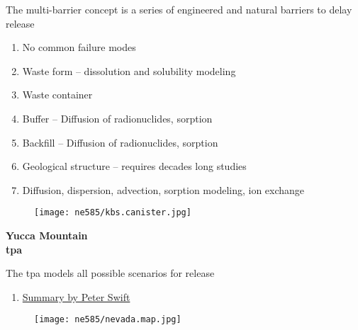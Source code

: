 \documentclass[aspectratio=1610,pdftex,dvipsnames,compress,xcolor={dvipsnames}]{beamer}
\newcommand{\acf}{\acrfull} %
\newcommand{\acs}{\acrshort} %
\begin{document}
\begin{frame}{The multi-barrier concept is a series of engineered and natural barriers to delay release}
    \begin{enumerate}[series=outerlist,topsep=0pt,itemsep=21pt,leftmargin=*,label=(\arabic*)]
        \item[]No common failure modes
        \item[]Waste form -- dissolution and solubility modeling
        \item[]Waste container
        \item[]Buffer -- Diffusion of radionuclides, sorption
        \item[]Backfill -- Diffusion of radionuclides, sorption
        \item[]Geological structure -- requires decades long studies
        \item[]Diffusion, dispersion, advection, sorption modeling, ion exchange
    \end{enumerate}
\end{frame}


\begin{frame}{}
    \begin{figure}
        \centering
        \texttt{[image: ne585/kbs.canister.jpg]}
    \end{figure}
\end{frame}


\begin{frame}[plain]{}
    \centering\LARGE\textbf{Yucca Mountain}\\
    \centering\LARGE\textbf{\acf{tpa}}
\end{frame}


\addtocounter{framenumber}{-1} 
\begin{frame}{The \acs{tpa} models all possible scenarios for release }
    \begin{enumerate}[resume=blue,topsep=0pt,itemsep=21pt,leftmargin=*,label=(\arabic*)]
        \item[]\href{https://www.osti.gov/servlets/purl/1142603}{Summary by Peter Swift}
    \end{enumerate}
\end{frame}


\begin{frame}{}
    \begin{figure}
        \centering
        \texttt{[image: ne585/nevada.map.jpg]}
    \end{figure}
\end{frame}
\end{document}
